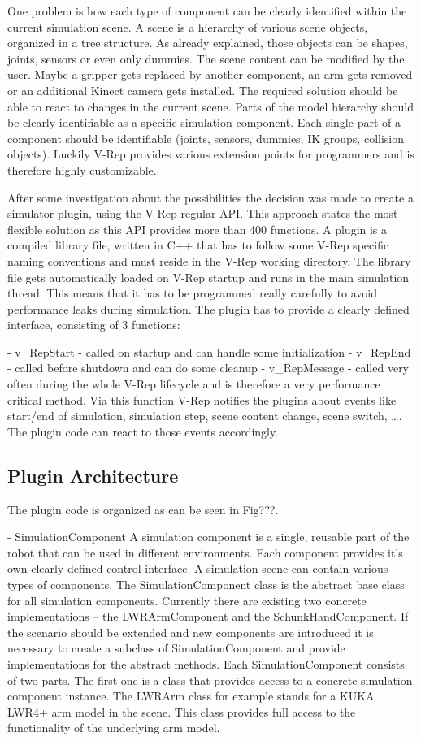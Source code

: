 One problem is how each type of component can be clearly identified within the current simulation scene. A scene is a hierarchy of various scene objects, organized in a tree structure. As already explained, those objects can be shapes, joints, sensors or even only dummies. The scene content can be modified by the user. Maybe a gripper gets replaced by another component, an arm gets removed or an additional Kinect camera gets installed. The required solution should be able to react to changes in the current scene. Parts of the model hierarchy should be clearly identifiable as a specific simulation component. Each single part of a component should be identifiable (joints, sensors, dummies, IK groups, collision objects). Luckily V-Rep provides various extension points for programmers and is therefore highly customizable. 

After some investigation about the possibilities the decision was made to create a simulator plugin, using the V-Rep regular API. This approach states the most flexible solution as this API provides more than 400 functions. A plugin is a compiled library file, written in C++ that has to follow some V-Rep specific naming conventions and must reside in the V-Rep working directory. The library file gets automatically loaded on V-Rep startup and runs in the main simulation thread. This means that it has to be programmed really carefully to avoid performance leaks during simulation. The plugin has to provide a clearly defined interface, consisting of 3 functions:

- v\_RepStart - called on startup and can handle some initialization
- v\_RepEnd - called before shutdown and can do some cleanup
- v\_RepMessage - called very often during the whole V-Rep lifecycle and is therefore a very
  performance critical method. Via this function V-Rep notifies the plugins about events like
  start/end of simulation, simulation step, scene content change, scene switch, \ldots.
  The plugin code can react to those events accordingly.


\subsection{Plugin Architecture}
The plugin code is organized as can be seen in Fig???.

- SimulationComponent
  A simulation component is a single, reusable part of the robot that can be used in different
  environments. Each component provides it's own clearly defined control interface. A simulation
  scene can contain various types of components. The SimulationComponent class is the abstract
  base class for all simulation components. Currently there are existing two concrete implementations
  -- the LWRArmComponent and the SchunkHandComponent. If the scenario should be extended and new
  components are introduced it is necessary to create a subclass of SimulationComponent and provide
  implementations for the abstract methods. Each SimulationComponent consists of two parts. The first 
  one is a class that provides access to a concrete simulation component instance. The LWRArm class
  for example stands for a KUKA LWR4+ arm model in the scene. This class provides full access to the
  functionality of the underlying arm model.
  
